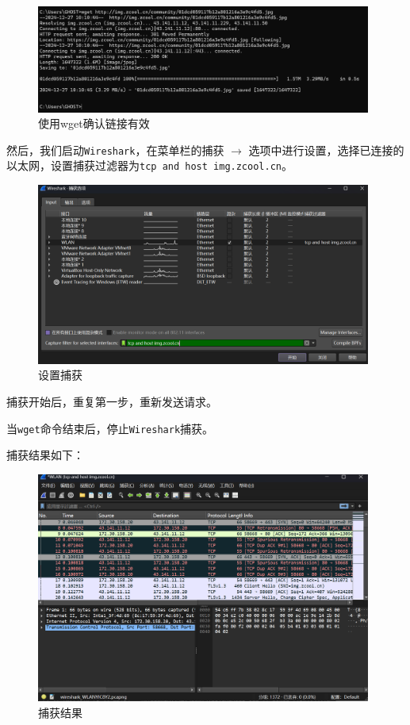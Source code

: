 \documentclass{article}
\begin{document}
	\begin{figure}[H]
		\centering
		\includegraphics[width=11cm]{images/1.使用wget确认链接有效.png}
		\caption{使用wget确认链接有效}
	\end{figure}
	
	然后，我们启动\texttt{Wireshark}，在菜单栏的捕获 \( \to \) 选项中进行设置，选择已连接的以太网，设置捕获过滤器为\texttt{tcp and host img.zcool.cn}。
	
	\begin{figure}[H]
		\centering
		\includegraphics[width=11cm]{images/2.设置捕获.png}
		\caption{设置捕获}
	\end{figure}
	
	捕获开始后，重复第一步，重新发送请求。
	
	当\texttt{wget}命令结束后，停止\texttt{Wireshark}捕获。
	
	捕获结果如下：
	
	\begin{figure}[H]
		\centering
		\includegraphics[width=11cm]{images/3.捕获结果.png}
		\caption{捕获结果}
	\end{figure}
	
\end{document}
